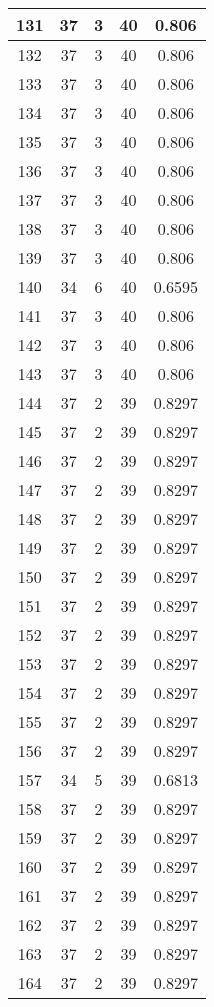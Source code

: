 \documentclass[letterpaper, 12pt]{article}
\begin{document}
\begin{longtable}{|c|c|c|c|c|}
131 & 37 & 3 & 40 & 0.806 \\
\hline
132 & 37 & 3 & 40 & 0.806 \\
\hline
133 & 37 & 3 & 40 & 0.806 \\
\hline
134 & 37 & 3 & 40 & 0.806 \\
\hline
135 & 37 & 3 & 40 & 0.806 \\
\hline
136 & 37 & 3 & 40 & 0.806 \\
\hline
137 & 37 & 3 & 40 & 0.806 \\
\hline
138 & 37 & 3 & 40 & 0.806 \\
\hline
139 & 37 & 3 & 40 & 0.806 \\
\hline
140 & 34 & 6 & 40 & 0.6595 \\
\hline
141 & 37 & 3 & 40 & 0.806 \\
\hline
142 & 37 & 3 & 40 & 0.806 \\
\hline
143 & 37 & 3 & 40 & 0.806 \\
\hline
144 & 37 & 2 & 39 & 0.8297 \\
\hline
145 & 37 & 2 & 39 & 0.8297 \\
\hline
146 & 37 & 2 & 39 & 0.8297 \\
\hline
147 & 37 & 2 & 39 & 0.8297 \\
\hline
148 & 37 & 2 & 39 & 0.8297 \\
\hline
149 & 37 & 2 & 39 & 0.8297 \\
\hline
150 & 37 & 2 & 39 & 0.8297 \\
\hline
151 & 37 & 2 & 39 & 0.8297 \\
\hline
152 & 37 & 2 & 39 & 0.8297 \\
\hline
153 & 37 & 2 & 39 & 0.8297 \\
\hline
154 & 37 & 2 & 39 & 0.8297 \\
\hline
155 & 37 & 2 & 39 & 0.8297 \\
\hline
156 & 37 & 2 & 39 & 0.8297 \\
\hline
157 & 34 & 5 & 39 & 0.6813 \\
\hline
158 & 37 & 2 & 39 & 0.8297 \\
\hline
159 & 37 & 2 & 39 & 0.8297 \\
\hline
160 & 37 & 2 & 39 & 0.8297 \\
\hline
161 & 37 & 2 & 39 & 0.8297 \\
\hline
162 & 37 & 2 & 39 & 0.8297 \\
\hline
163 & 37 & 2 & 39 & 0.8297 \\
\hline
164 & 37 & 2 & 39 & 0.8297 \\
\hline

\end{longtable}
\end{document}
